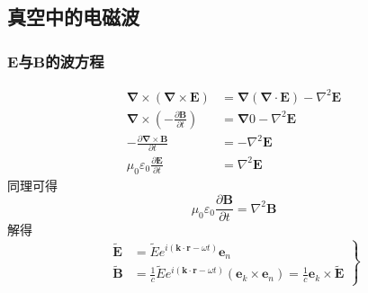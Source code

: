 \subsection{真空中的电磁波}
\subsubsection{$\boldsymbol E$与$\boldsymbol B$的波方程}
\begin{align}
    \boldsymbol{\nabla}\times\left(\boldsymbol{\nabla}\times\boldsymbol{E}\right)
    &=\boldsymbol{\nabla}\left(\boldsymbol{\nabla}\cdot\boldsymbol{E}\right)-\nabla^2\boldsymbol{E}\nonumber\\
    \boldsymbol{\nabla}\times\left(-\frac{\partial \boldsymbol{B}}{\partial t}\right)
    &=\boldsymbol{\nabla}0-\nabla^2\boldsymbol{E}\nonumber\\
    -\frac{\partial \boldsymbol{\nabla}\times\boldsymbol{B}}{\partial t}
    &=-\nabla^2\boldsymbol{E}\nonumber\\
    \mu_0\varepsilon_0\frac{\partial \boldsymbol{E}}{\partial t}
    &=\nabla^2\boldsymbol{E}
\end{align}
同理可得
\begin{equation}
    \mu_0\varepsilon_0\dfrac{\partial \boldsymbol{B}}{\partial t}=\nabla^2\boldsymbol{B}
\end{equation}
解得
\begin{equation}
\left.\begin{aligned}
\widetilde{\boldsymbol{E}} &= \widetilde{E}e^{i(\boldsymbol{k}\cdot\boldsymbol{r}-\omega t)}\boldsymbol{e}_n\\
\widetilde{\boldsymbol{B}} &= \frac{1}{c}\widetilde{E}e^{i(\boldsymbol{k}\cdot\boldsymbol{r}-\omega t)}\left(\boldsymbol{e}_k\times\boldsymbol{e}_n\right)=\frac{1}{c}\boldsymbol{e}_k\times\widetilde{\boldsymbol{E}}
\end{aligned}\right\}
\label{单色平面波}
\end{equation}
